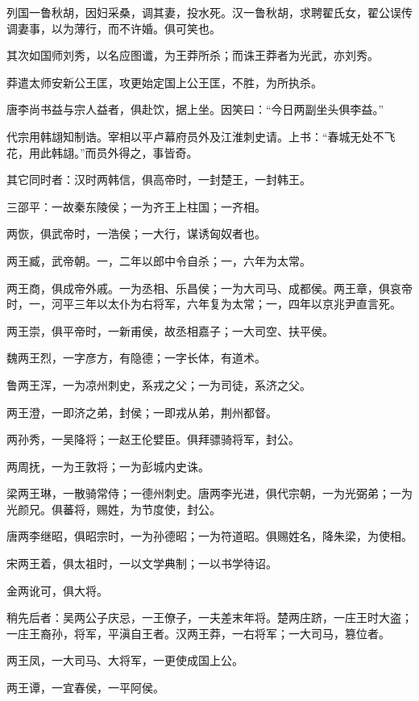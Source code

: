\documentclass[a4paper,12pt,UTF8,twoside]{ctexbook}
\begin{document}
    列国一鲁秋胡，因妇采桑，调其妻，投水死。汉一鲁秋胡，求聘翟氏女，翟公误传调妻事，以为薄行，而不许婚。俱可笑也。
    
    其次如国师刘秀，以名应图谶，为王莽所杀；而诛王莽者为光武，亦刘秀。
    
    莽遣太师安新公王匡，攻更始定国上公王匡，不胜，为所执杀。
    
    唐李尚书益与宗人益者，俱赴饮，据上坐。因笑曰：“今日两副坐头俱李益。”
    
    代宗用韩翃知制诰。宰相以平卢幕府员外及江淮刺史请。上书：“春城无处不飞花，用此韩翃。”而员外得之，事皆奇。
    
    其它同时者：汉时两韩信，俱高帝时，一封楚王，一封韩王。
    
    三邵平：一故秦东陵侯；一为齐王上柱国；一齐相。
    
    两恢，俱武帝时，一浩侯；一大行，谋诱匈奴者也。
    
    两王臧，武帝朝。一，二年以郎中令自杀；一，六年为太常。
    
    两王商，俱成帝外戚。一为丞相、乐昌侯；一为大司马、成都侯。两王章，俱哀帝时，一，河平三年以太仆为右将军，六年复为太常；一，四年以京兆尹直言死。
    
    两王崇，俱平帝时，一新甫侯，故丞相嘉子；一大司空、扶平侯。
    
    魏两王烈，一字彦方，有隐德；一字长体，有道术。
    
    鲁两王浑，一为凉州刺史，系戎之父；一为司徒，系济之父。
    
    两王澄，一即济之弟，封侯；一即戎从弟，荆州都督。
    
    两孙秀，一吴降将；一赵王伦嬖臣。俱拜骠骑将军，封公。
    
    两周抚，一为王敦将；一为彭城内史诛。
    
    梁两王琳，一散骑常侍；一德州刺史。唐两李光进，俱代宗朝，一为光弼弟；一为光颜兄。俱蕃将，赐姓，为节度使，封公。
    
    唐两李继昭，俱昭宗时，一为孙德昭；一为符道昭。俱赐姓名，降朱梁，为使相。
    
    宋两王着，俱太祖时，一以文学典制；一以书学待诏。
    
    金两讹可，俱大将。
    
    稍先后者：吴两公子庆忌，一王僚子，一夫差末年将。楚两庄跻，一庄王时大盗；一庄王裔孙，将军，平滇自王者。汉两王莽，一右将军；一大司马，篡位者。
    
    两王凤，一大司马、大将军，一更使成国上公。
    
    两王谭，一宜春侯，一平阿侯。
    
\end{document}
